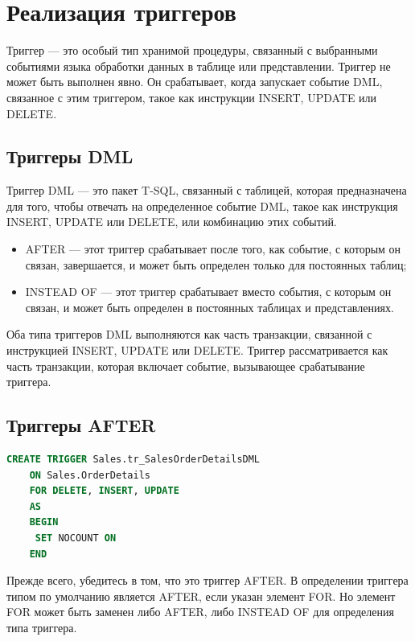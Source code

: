 \section{Реализация триггеров}

Триггер — это особый тип хранимой процедуры, связанный с выбранными
событиями языка обработки данных в таблице или представлении. Триггер
не может быть выполнен явно. Он срабатывает, когда запускает событие
DML, связанное с этим триггером, такое как инструкции INSERT, UPDATE или DELETE. 


\subsection{Триггеры DML}

Триггер DML — это пакет T-SQL, связанный с таблицей, которая предназначена для того, чтобы отвечать на определенное событие DML, такое как
инструкция INSERT, UPDATE или DELETE, или комбинацию этих событий.

\begin{itemize}
	\item AFTER — этот триггер срабатывает после того, как событие, с которым он связан,
	завершается, и может быть определен только для постоянных таблиц; 
	\item INSTEAD OF — этот триггер срабатывает вместо события, с которым он связан,
	и может быть определен в постоянных таблицах и представлениях. 
\end{itemize}

Оба типа триггеров DML выполняются как часть транзакции, связанной с инструкцией INSERT, UPDATE или DELETE. Триггер рассматривается как часть транзакции, которая включает событие, вызывающее срабатывание триггера. 

\subsection{Триггеры AFTER}

\begin{lstlisting}[label=lst:funcReturn, language=sql]
	CREATE TRIGGER Sales.tr_SalesOrderDetailsDML
	ON Sales.OrderDetails
	FOR DELETE, INSERT, UPDATE
	AS
	BEGIN
	 SET NOCOUNT ON
	END 
\end{lstlisting}

Прежде всего, убедитесь в том, что это триггер AFTER. В определении триггера типом по умолчанию является AFTER, если указан элемент FOR. Но элемент FOR может
быть заменен либо AFTER, либо INSTEAD OF для определения типа триггера. 

